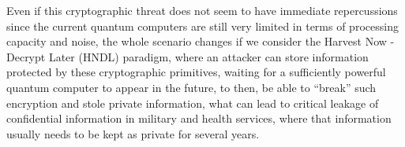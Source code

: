 \documentclass[runningheads]{llncs}
\numberwithin{equation}{section}
\begin{document}
    Even if this cryptographic threat does not seem to have immediate repercussions since the current quantum computers are still very limited in terms of processing capacity and noise, the whole scenario changes if we consider the Harvest Now - Decrypt Later (HNDL) paradigm, where an attacker can store information protected by these cryptographic primitives, waiting for a sufficiently powerful quantum computer to appear in the future, to then, be able to ``break'' such encryption and stole private information, what can lead to critical leakage of confidential information in military and health services, where that information usually needs to be kept as private for several years.
    
    \newpage


    
    
\end{document}
